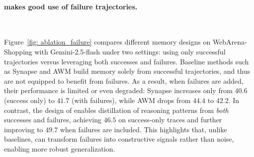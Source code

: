 \paragraph{\ours{} makes good use of failure trajectories.}~\label{exp: ablation}

Figure~\ref{fig: ablation_failure} compares different memory designs on WebArena-Shopping with Gemini-2.5-flash under two settings: using only successful trajectories versus leveraging both successes and failures. 
Baseline methods such as Synapse and AWM build memory solely from successful trajectories, and thus are not equipped to benefit from failures. 
As a result, when failures are added, their performance is limited or even degraded: Synapse increases only from $40.6$ (success only) to $41.7$ (with failures), while AWM drops from $44.4$ to $42.2$. 
In contrast, the design of \ours{} enables distillation of reasoning patterns from \emph{both} successes and failures, achieving $46.5$ on success-only traces and further improving to $49.7$ when failures are included. 
This highlights that, unlike baselines, \ours{} can transform failures into constructive signals rather than noise, enabling more robust generalization.


